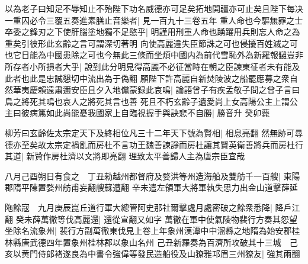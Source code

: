以為老子曰知足不辱知止不殆陛下功名威德亦可足矣拓地開疆亦可止矣且陛下每决一重囚必令三覆五奏進素膳止音樂者|{
	見一百九十三卷五年}
重人命也今驅無罪之士卒委之鋒刃之下使肝腦塗地獨不足愍乎|{
	明謹用刑重人命也踴躍用兵則忘人命之為重矣引彼形此玄齡之言可謂深切著明}
向使高麗違失臣節誅之可也侵擾百姓滅之可也它日能為中國患除之可也今無此三條而坐煩中國内為前代雪恥外為新羅報讎豈非所存者小所損者大乎|{
	說到此分明見得高麗不必征當時在朝之臣諫東征者未有能及此者也此是忠誠懇切中流出為于偽翻}
願陛下許高麗自新焚陵波之船罷應募之衆自然華夷慶賴遠肅邇安臣且夕入地儻蒙録此哀鳴|{
	論語曾子有疾孟敬子問之曾子言曰鳥之將死其鳴也哀人之將死其言也善}
死且不朽玄齡子遺愛尚上女高陽公主上謂公主曰彼病篤如此尚能憂我國家上自臨視握手與訣悲不自勝|{
	勝音升}
癸卯薨

柳芳曰玄齡佐太宗定天下及終相位凡三十二年天下號為賢相|{
	相息亮翻}
然無跡可尋德亦至矣故太宗定禍亂而房杜不言功王魏善諫諍而房杜讓其賢英衛善將兵而房杜行其道|{
	新贊作房杜濟以文將即亮翻}
理致太平善歸人主為唐宗臣宜哉

八月己酉朔日有食之　丁丑勑越州都督府及婺洪等州造海船及雙舫千一百艘|{
	東陽郡隋平陳置婺州舫甫妄翻艘蘇遭翻}
辛未遣左領軍大將軍執失思力出金山道擊薛延

陁餘宼　九月庚辰崑丘道行軍大總管阿史那社爾擊處月處密破之餘衆悉降|{
	降戶江翻}
癸未薛萬徹等伐高麗還|{
	還從宣翻又如字}
萬徹在軍中使氣陵物裴行方奏其怨望坐除名流象州|{
	裴行方副萬徹東伐見上卷上年象州漢潭中中溜縣之地隋為始安郡桂林縣唐武德四年置象州桂林郡以象山名州}
己丑新羅奏為百濟所攻破其十三城　己亥以黄門侍郎褚遂良為中書令強偉等發民造船役及山獠雅邛眉三州獠友|{
	強其兩翻}


